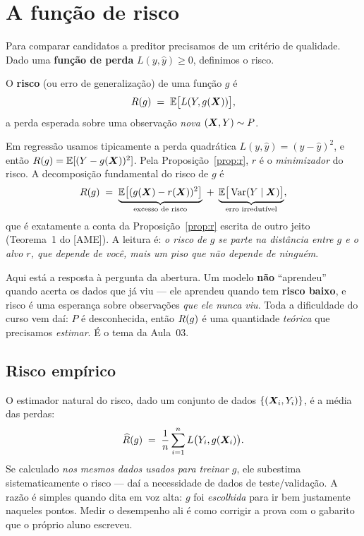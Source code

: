 \documentclass[11pt,a4paper]{article}
\begin{document}
\section{A função de risco}\label{sec:risco}
Para comparar candidatos a preditor precisamos de um critério de qualidade. Dado
uma \textbf{função de perda} $L(y,\hat y)\ge 0$, definimos o risco.

\begin{definicao}[Risco]
O \textbf{risco} (ou erro de generalização) de uma função $g$ é
\begin{equation}\label{eq:risco}
  R(g) \;=\; \mathbb{E}\big[L(Y,g(\bm{X}))\big],
\end{equation}
a perda esperada sobre uma observação \emph{nova} $(\bm{X},Y)\sim P$.
\end{definicao}

Em regressão usamos tipicamente a perda quadrática $L(y,\hat y)=(y-\hat y)^2$, e
então $R(g)=\mathbb{E}[(Y-g(\bm{X}))^2]$. Pela Proposição~\ref{prop:r}, $r$ é o
\emph{minimizador} do risco. A decomposição fundamental do risco de $g$ é
\begin{equation}\label{eq:decomprisco}
  R(g) \;=\; \underbrace{\mathbb{E}\big[(g(\bm{X})-r(\bm{X}))^2\big]}_{\text{excesso de risco}}
              \;+\; \underbrace{\mathbb{E}\big[\operatorname{Var}(Y\mid\bm{X})\big]}_{\text{erro irredutível}},
\end{equation}
que é exatamente a conta da Proposição~\ref{prop:r} escrita de outro jeito
(Teorema~1 do [AME]). A leitura é: \emph{o risco de $g$ se parte na distância entre
$g$ e o alvo $r$, que depende de você, mais um piso que não depende de ninguém}.

\begin{atencao}
Aqui está a resposta à pergunta da abertura. Um modelo \textbf{não} ``aprendeu''
quando acerta os dados que já viu --- ele aprendeu quando tem \textbf{risco baixo},
e risco é uma esperança sobre observações \emph{que ele nunca viu}. Toda a
dificuldade do curso vem daí: $P$ é desconhecida, então $R(g)$ é uma quantidade
\emph{teórica} que precisamos \emph{estimar}. É o tema da Aula~03.
\end{atencao}

\subsection{Risco empírico}
O estimador natural do risco, dado um conjunto de dados $\{(\bm{X}_i,Y_i)\}$, é a média
das perdas:
\begin{equation}\label{eq:remp}
  \widehat{R}(g) \;=\; \frac1n \sum_{i=1}^n L\big(Y_i,g(\bm{X}_i)\big).
\end{equation}
Se calculado \emph{nos mesmos dados usados para treinar} $g$, ele subestima
sistematicamente o risco --- daí a necessidade de dados de teste/validação. A razão é
simples quando dita em voz alta: $g$ foi \emph{escolhida} para ir bem justamente
naqueles pontos. Medir o desempenho ali é como corrigir a prova com o gabarito que o
próprio aluno escreveu.
\end{document}
